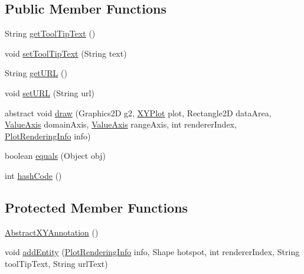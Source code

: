 \subsection*{Public Member Functions}
\begin{DoxyCompactItemize}
\item 
String \mbox{\hyperlink{classorg_1_1jfree_1_1chart_1_1annotations_1_1_abstract_x_y_annotation_a800bd322b53941c7fe518d9578dab7ce}{get\+Tool\+Tip\+Text}} ()
\item 
void \mbox{\hyperlink{classorg_1_1jfree_1_1chart_1_1annotations_1_1_abstract_x_y_annotation_a8dbccbba7b65f42906aa5dda54ff1335}{set\+Tool\+Tip\+Text}} (String text)
\item 
String \mbox{\hyperlink{classorg_1_1jfree_1_1chart_1_1annotations_1_1_abstract_x_y_annotation_af3c7b1a1f7270c9a6d057adbb9e1e6f1}{get\+U\+RL}} ()
\item 
void \mbox{\hyperlink{classorg_1_1jfree_1_1chart_1_1annotations_1_1_abstract_x_y_annotation_a3d06b6d644ba7bc73eaacb44ea033fcb}{set\+U\+RL}} (String url)
\item 
abstract void \mbox{\hyperlink{classorg_1_1jfree_1_1chart_1_1annotations_1_1_abstract_x_y_annotation_a1a3d345534006a22dfd3e23a16b23bf7}{draw}} (Graphics2D g2, \mbox{\hyperlink{classorg_1_1jfree_1_1chart_1_1plot_1_1_x_y_plot}{X\+Y\+Plot}} plot, Rectangle2D data\+Area, \mbox{\hyperlink{classorg_1_1jfree_1_1chart_1_1axis_1_1_value_axis}{Value\+Axis}} domain\+Axis, \mbox{\hyperlink{classorg_1_1jfree_1_1chart_1_1axis_1_1_value_axis}{Value\+Axis}} range\+Axis, int renderer\+Index, \mbox{\hyperlink{classorg_1_1jfree_1_1chart_1_1plot_1_1_plot_rendering_info}{Plot\+Rendering\+Info}} info)
\item 
boolean \mbox{\hyperlink{classorg_1_1jfree_1_1chart_1_1annotations_1_1_abstract_x_y_annotation_a8232ac45b31fe9c8d37038d8210b9f90}{equals}} (Object obj)
\item 
int \mbox{\hyperlink{classorg_1_1jfree_1_1chart_1_1annotations_1_1_abstract_x_y_annotation_a47db97c04a85bdd2c90720d2f7a743a2}{hash\+Code}} ()
\end{DoxyCompactItemize}
\subsection*{Protected Member Functions}
\begin{DoxyCompactItemize}
\item 
\mbox{\hyperlink{classorg_1_1jfree_1_1chart_1_1annotations_1_1_abstract_x_y_annotation_a91cc8506ba612ee0ce0433a83913cfae}{Abstract\+X\+Y\+Annotation}} ()
\item 
void \mbox{\hyperlink{classorg_1_1jfree_1_1chart_1_1annotations_1_1_abstract_x_y_annotation_a90e79fe26457c52a4aac5770ab679d10}{add\+Entity}} (\mbox{\hyperlink{classorg_1_1jfree_1_1chart_1_1plot_1_1_plot_rendering_info}{Plot\+Rendering\+Info}} info, Shape hotspot, int renderer\+Index, String tool\+Tip\+Text, String url\+Text)
\end{DoxyCompactItemize}


